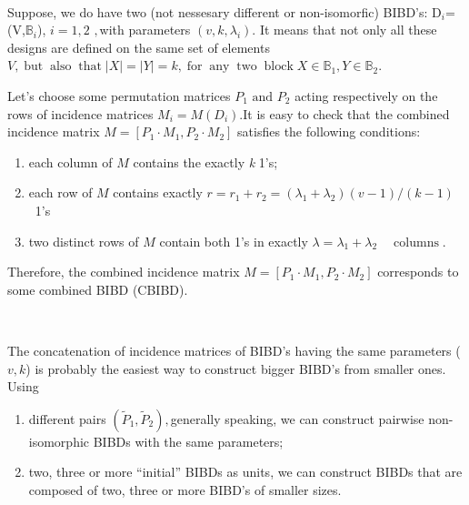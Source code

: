 \documentclass{article}
\newcommand{\infixand}{\text{ and }}
\newcommand{\tmem}[1]{{\em #1\/}}
\newcommand{\tmop}[1]{\ensuremath{\operatorname{#1}}}
\newcommand{\tmrsub}[1]{\ensuremath{_{\textrm{#1}}}}
\newenvironment{enumeratealpha}{\begin{enumerate}[a{\textup{)}}] }{\end{enumerate}}
\newenvironment{tmparmod}[3]{\begin{list}{}{\setlength{\topsep}{0pt}\setlength{\leftmargin}{#1}\setlength{\rightmargin}{#2}\setlength{\parindent}{#3}\setlength{\listparindent}{\parindent}\setlength{\itemindent}{\parindent}\setlength{\parsep}{\parskip}} \item[]}{\end{list}}
\begin{document}
\

\begin{tmparmod}{0pt}{0pt}{0tab}%
  Suppose, we do have two (not nessesary different or non-isomorfic) BIBD's:
  D\tmrsub{$i$}= (V,\ensuremath{\mathbb{B}}\tmrsub{$i$}), $i = 1, 2$ $,$with
  parameters $(v, k, \lambda_i)$. It means that not only all these designs are
  defined on the same set of elements $V, \tmop{but} \tmop{also} \tmop{that} |
  X | = | Y | = k, \tmop{for} \tmop{any} \tmop{two} \tmop{block} X \in
  \mathbb{B}_1, Y \in \mathbb{B}_2$.
\end{tmparmod}



\begin{tmparmod}{0pt}{0pt}{0tab}%
  Let's choose some permutation matrices $P_1 \infixand P_2$ acting
  respectively on the rows of incidence matrices $M_i = M  (D_i) .$It is easy
  to check that the combined incidence matrix $M = [P_1 \cdot M_1, P_2 \cdot
  M_2]$ satisfies the following conditions:
  \begin{enumeratealpha}
    \item each column of $M$ contains the exactly {\tmem{k}} 1's;
    
    \item each row of $M$ contains exactly $r = r_1 + r_2 = (\lambda_1 +
    \lambda_2)  (v - 1) / (k - 1)$ \ 1's
    
    \item two distinct rows of $M$ contain both 1's in exactly $\lambda =
    \lambda_1 + \lambda_2 \quad \tmop{columns} .$
  \end{enumeratealpha}
  Therefore, the combined incidence matrix $M = [P_1 \cdot M_1, P_2 \cdot
  M_2]$ corresponds to some combined BIBD (CBIBD).
  
  \
  
  The concatenation of incidence matrices of BIBD's having the same
  parameters ($v, k$) is probably the easiest way to construct bigger BIBD's
  from smaller ones. Using
  \begin{enumeratealpha}
    \item different pairs $(\tilde{P}_1, \tilde{P}_2),$generally speaking, we
    can construct pairwise non-isomorphic BIBDs with the same parameters;
    
    \item two, three or more ``initial'' BIBDs as units, we can construct
    BIBDs that are composed of two, three or more BIBD's of smaller sizes.
  \end{enumeratealpha}
\end{tmparmod}
\end{document}

